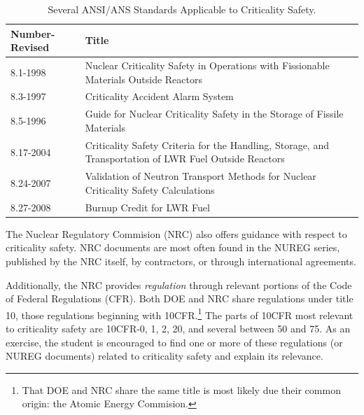 \begin{table}[ht]
    \caption{Several ANSI/ANS Standards Applicable to Criticality Safety.}
    \begin{center} 
    \begin{tabular*}{1.00\textwidth}{@{\extracolsep{\fill}} p{3cm}p{} } 
      \toprule 
	Number-Revised    &  Title \\
      \midrule
       8.1-1998                  &  Nuclear Criticality Safety in Operations 
                                    with Fissionable Materials Outside 
                                    Reactors \\
       8.3-1997                  &  Criticality Accident Alarm System \\
       8.5-1996                  &  Guide for Nuclear Criticality Safety in 
                                    the Storage of Fissile Materials \\
       8.17-2004                 &  Criticality Safety Criteria for the 
                                    Handling, Storage, and Transportation 
                                    of LWR Fuel Outside Reactors \\
       8.24-2007                 &  Validation of Neutron Transport 
                                    Methods for Nuclear Criticality Safety 
                                    Calculations \\
       8.27-2008                 &  Burnup Credit for LWR Fuel \\
      \bottomrule 
    \end{tabular*} 
    \end{center} 
    \label{tbl:ansstandard}
\end{table}

The Nuclear Regulatory Commision (NRC) also offers guidance with 
respect to criticality safety.  NRC documents are most often found in 
the NUREG series, published by the NRC itself, by contractors, or through
international agreements.  

Additionally, the NRC provides \textit{regulation} through relevant 
portions of the Code of Federal Regulations (CFR).  Both DOE and NRC
share regulations under title 10, \ie those regulations beginning
with 10CFR.\footnote{That DOE and NRC share the same title is most likely
due their common origin: the Atomic Energy Commision.}
The parts of 10CFR most relevant to criticality safety are 10CFR-0, 1, 2,
20, and several between 50 and 75.  As an exercise, the student is
encouraged to find one or more of these regulations (or NUREG documents)
related to criticality safety and explain its relevance.

